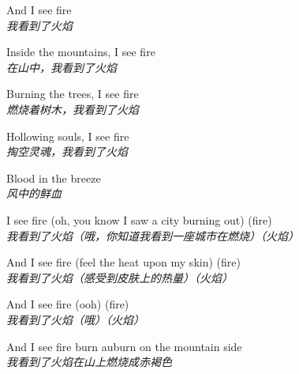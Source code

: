 \begin{spacing}{1.5}
\begin{flushleft}
And I see fire\\
\textit{我看到了火焰}\lyricspace

Inside the mountains, I see fire\\
\textit{在山中，我看到了火焰}\lyricspace

Burning the trees, I see fire\\
\textit{燃烧着树木，我看到了火焰}\lyricspace

Hollowing souls, I see fire\\
\textit{掏空灵魂，我看到了火焰}\lyricspace

Blood in the breeze\\
\textit{风中的鲜血}\lyricspace

I see fire (oh, you know I saw a city burning out) (fire)\\
\textit{我看到了火焰（哦，你知道我看到一座城市在燃烧）（火焰）}\lyricspace

And I see fire (feel the heat upon my skin) (fire)\\
\textit{我看到了火焰（感受到皮肤上的热量）（火焰）}\lyricspace

And I see fire (ooh) (fire)\\
\textit{我看到了火焰（哦）（火焰）}\lyricspace

And I see fire burn auburn on the mountain side\\
\textit{我看到了火焰在山上燃烧成赤褐色}\lyricspace
\end{flushleft}
\end{spacing} 
